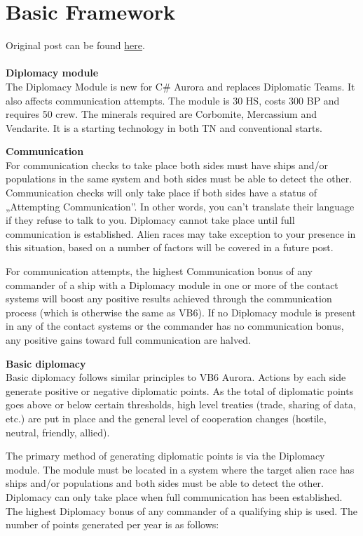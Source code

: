 \documentclass[../../Aurora C# unofficial manual.tex]{subfiles}
\begin{document}
	\section{Basic Framework}\label{1_basic_framework}
	Original post can be found
	\href{http://aurora2.pentarch.org/index.php?topic=8495.msg118258#msg118258}{here}.
	\\\\
	
	\textbf{Diplomacy module}\\
	The Diplomacy Module is new for C\# Aurora and replaces Diplomatic Teams. It also affects communication attempts. The module is 30 HS, costs 300 BP and requires 50 crew. The minerals required are Corbomite, Mercassium and Vendarite. It is a starting technology in both TN and conventional starts.
	
	\textbf{Communication}\\
	For communication checks to take place both sides must have ships and/or populations in the same system and both sides must be able to detect the other. Communication checks will only take place if both sides have a status of „Attempting Communication”. In other words, you can't translate their language if they refuse to talk to you. Diplomacy cannot take place until full communication is established. Alien races may take exception to your presence in this situation, based on a number of factors will be covered in a future post.
	
	For communication attempts, the highest Communication bonus of any commander of a ship with a Diplomacy module in one or more of the contact systems will boost any positive results achieved through the communication process (which is otherwise the same as VB6). If no Diplomacy module is present in any of the contact systems or the commander has no communication bonus, any positive gains toward full communication are halved.
	
	\textbf{Basic diplomacy}\\
	Basic diplomacy follows similar principles to VB6 Aurora. Actions by each side generate positive or negative diplomatic points. As the total of diplomatic points goes above or below certain thresholds, high level treaties (trade, sharing of data, etc.) are put in place and the general level of cooperation changes (hostile, neutral, friendly, allied).
	
	The primary method of generating diplomatic points is via the Diplomacy module. The module must be located in a system where the target alien race has ships and/or populations and both sides must be able to detect the other. Diplomacy can only take place when full communication has been established. The highest Diplomacy bonus of any commander of a qualifying ship is used. The number of points generated per year is as follows:
	
\end{document}
